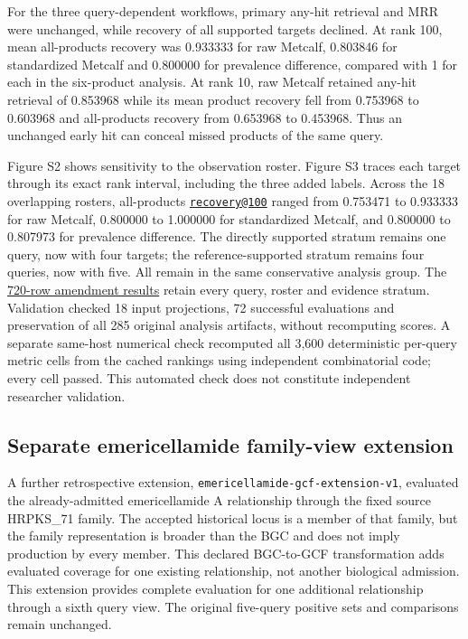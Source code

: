 \documentclass[
  10pt,
  a4paper,
]{article}
\begin{document}
For the three query-dependent workflows, primary any-hit retrieval and MRR were unchanged, while recovery of all supported targets declined. At rank 100, mean all-products recovery was 0.933333 for raw Metcalf, 0.803846 for standardized Metcalf and 0.800000 for prevalence difference, compared with 1 for each in the six-product analysis. At rank 10, raw Metcalf retained any-hit retrieval of 0.853968 while its mean product recovery fell from 0.753968 to 0.603968 and all-products recovery from 0.653968 to 0.453968. Thus an unchanged early hit can conceal missed products of the same query.

Figure S2 shows sensitivity to the observation roster. Figure S3 traces each target through its exact rank interval, including the three added labels. Across the 18 overlapping rosters, all-products \href{mailto:recovery@100}{\nolinkurl{recovery@100}} ranged from 0.753471 to 0.933333 for raw Metcalf, 0.800000 to 1.000000 for standardized Metcalf, and 0.800000 to 0.807973 for prevalence difference. The directly supported stratum remains one query, now with four targets; the reference-supported stratum remains four queries, now with five. All remain in the same conservative analysis group. The \href{https://github.com/vinvomero/fungallink-benchmark/blob/main/manuscript/expanded-label-results-2026-10-07.tsv}{720-row amendment results} retain every query, roster and evidence stratum. Validation checked 18 input projections, 72 successful evaluations and preservation of all 285 original analysis artifacts, without recomputing scores. A separate same-host numerical check recomputed all 3,600 deterministic per-query metric cells from the cached rankings using independent combinatorial code; every cell passed. This automated check does not constitute independent researcher validation.

\subsection{Separate emericellamide family-view extension}\label{separate-emericellamide-family-view-extension}

A further retrospective extension, \nolinkurl{emericellamide-gcf-extension-v1}, evaluated the already-admitted emericellamide A relationship through the fixed source HRPKS\_71 family. The accepted historical locus is a member of that family, but the family representation is broader than the BGC and does not imply production by every member. This declared BGC-to-GCF transformation adds evaluated coverage for one existing relationship, not another biological admission. This extension provides complete evaluation for one additional relationship through a sixth query view. The original five-query positive sets and comparisons remain unchanged.
\end{document}

